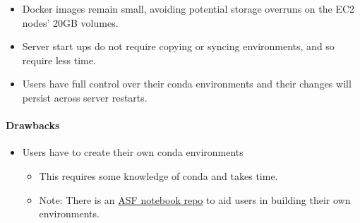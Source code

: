 \begin{itemize}
\item Docker images remain small, avoiding potential storage overruns on the EC2 nodes' 20GB volumes.
\item Server start ups do not require copying or syncing environments, and so require less time.
\item Users have full control over their conda environments and their changes will persist across server restarts.
\end{itemize}

\paragraph{Drawbacks}

\begin{itemize}
\item Users have to create their own conda environments\begin{itemize}
\item This requires some knowledge of conda and takes time.
\item Note: There is an \href{https://github.com/ASFOpenSARlab/opensarlab-envs}{ASF notebook repo} to aid users in building their own environments.
\end{itemize}
\end{itemize}